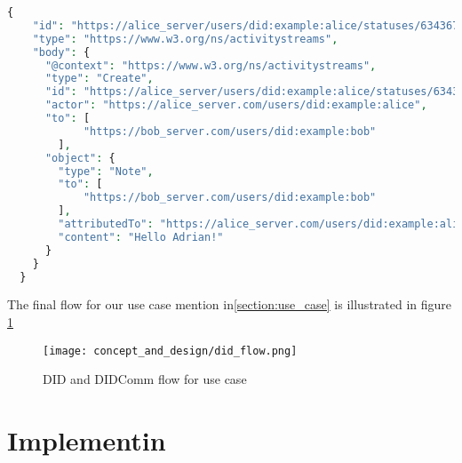 \lstset{style=JSONStyle}
\begin{lstlisting}[language=PHP, caption=JWM example, label=fig:jwm_example, float=h]
  {
    "id": "https://alice_server/users/did:example:alice/statuses/634367/activity",
    "type": "https://www.w3.org/ns/activitystreams",
    "body": {
      "@context": "https://www.w3.org/ns/activitystreams",
      "type": "Create",
      "id": "https://alice_server/users/did:example:alice/statuses/634367/activity",
      "actor": "https://alice_server.com/users/did:example:alice",
      "to": [ 
            "https://bob_server.com/users/did:example:bob"
        ],
      "object": {
        "type": "Note",
        "to": [ 
            "https://bob_server.com/users/did:example:bob"
        ],
        "attributedTo": "https://alice_server.com/users/did:example:alice",
        "content": "Hello Adrian!"
      }
    }
  }
\end{lstlisting}



The final flow for our use case mention in\ref{section:use_case} is illustrated in figure \ref{fig:did_flow}

\begin{figure}[h]
  \centering
  \texttt{[image: concept\_and\_design/did\_flow.png]}
  \caption{DID and DIDComm flow for use case}
  \label{fig:did_flow}
\end{figure}


\section{Implementin}

%







